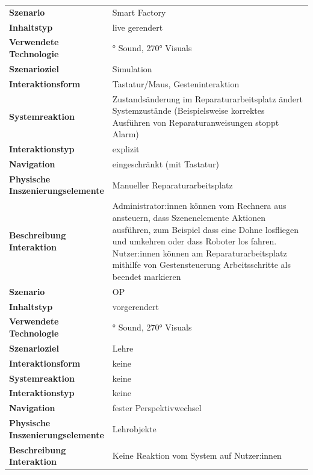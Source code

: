 \begin{longtable} {>{\raggedright\arraybackslash}p{0.3\linewidth}
    >{\raggedright\arraybackslash}p{0.7\linewidth}}
    \textbf{Szenario} & Smart Factory \\
    \textbf{Inhaltstyp} & live gerendert \\
    \textbf{Verwendete Technologie} & 360° Sound, 270° Visuals \\
    \textbf{Szenarioziel} & Simulation \\
    \textbf{Interaktionsform} & Tastatur/Maus, Gesteninteraktion \\
    \textbf{Systemreaktion} & Zustandsänderung im Reparaturarbeitsplatz ändert Systemzustände (Beispielsweise korrektes Ausführen von Reparaturanweisungen stoppt Alarm)\\
    \textbf{Interaktionstyp} & explizit \\
    \textbf{Navigation} & eingeschränkt (mit Tastatur) \\
    \textbf{Physische Inszenierungselemente} & Manueller Reparaturarbeitsplatz \\
    \textbf{Beschreibung Interaktion} & Administrator:innen können vom Rechnera aus ansteuern, dass Szenenelemente Aktionen ausführen, zum Beispiel dass eine Dohne losfliegen und umkehren oder dass Roboter los fahren. Nutzer:innen können am Reparaturarbeitsplatz mithilfe von Gestensteuerung Arbeitsschritte als beendet markieren \\[0.8em]
    \midrule

    \textbf{Szenario} & OP \\
    \textbf{Inhaltstyp} & vorgerendert \\
    \textbf{Verwendete Technologie} & 360° Sound, 270° Visuals \\
    \textbf{Szenarioziel} & Lehre \\
    \textbf{Interaktionsform} & keine \\
    \textbf{Systemreaktion} & keine \\
    \textbf{Interaktionstyp} & keine \\
    \textbf{Navigation} & fester Perspektivwechsel \\
    \textbf{Physische Inszenierungselemente} & Lehrobjekte \\
    \textbf{Beschreibung Interaktion} & Keine Reaktion vom System auf Nutzer:innen \\[0.8em]
    \midrule


\end{longtable}
